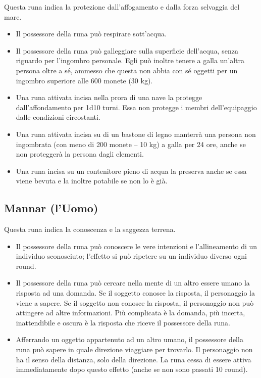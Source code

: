 \documentclass[10pt,a4paper]{article}
\begin{document}
Questa runa indica la protezione dall'affogamento e dalla forza selvaggia del mare.
  \begin{itemize}
\item       Il possessore della runa pu\`{o} respirare sott'acqua.
 
\item       Il possessore della runa pu\`{o} galleggiare sulla superficie dell'acqua, senza riguardo per l'ingombro personale. Egli pu\`{o} inoltre tenere a galla un'altra persona oltre a s\'{e}, ammesso che questa non abbia con s\'{e} oggetti per un ingombro superiore alle 600 monete (30 kg).
 
\item        Una runa attivata incisa nella prora di una nave la protegge dall'affondamento per 1d10 turni. Essa non protegge i membri dell'equipaggio dalle condizioni circostanti.
 
\item        Una runa attivata incisa su di un bastone di legno manterr\`{a} una persona non ingombrata (con meno di 200 monete -- 10 kg) a galla per 24 ore, anche se non protegger\`{a} la persona dagli elementi.

\item		Una runa incisa su un contenitore pieno di acqua la preserva anche se essa viene bevuta e la inoltre potabile se non lo \`{e} gi\`{a}.
 \end{itemize}
 
 
\subsection*{Mannar (l'Uomo)}
 
Questa runa indica la conoscenza e la saggezza terrena.
  \begin{itemize}
\item       Il possessore della runa pu\`{o} conoscere le vere intenzioni e l'allineamento di un individuo sconosciuto; l'effetto si pu\`{o} ripetere su un individuo diverso ogni round.
 
\item       Il possessore della runa pu\`{o} cercare nella mente di un altro essere umano la risposta ad una domanda. Se il soggetto conosce la risposta, il personaggio la viene a sapere. Se il soggetto non conosce la risposta, il personaggio non pu\`{o} attingere ad altre informazioni. Pi\`{u} complicata \`{e} la domanda, pi\`{u} incerta, inattendibile e oscura \`{e} la risposta che riceve il possessore della runa.
 
\item        Afferrando un oggetto appartenuto ad un altro umano, il possessore della runa pu\`{o} sapere in quale direzione viaggiare per trovarlo. Il personaggio non ha il senso della distanza, solo della direzione. La runa cessa di essere attiva immediatamente dopo questo effetto (anche se non sono passati 10 round).
 \end{itemize}
 
\end{document}
